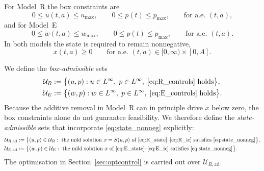 \documentclass[pdflatex,sn-mathphys-num]{sn-jnl}
\theoremstyle{definition}
\theoremstyle{remark}
\begin{document}
For Model~R the box constraints are
\begin{equation}
0\le u(t,a)\le u_{\max}, \qquad 0\le p(t)\le p_{\max},
\qquad \text{for a.e. } (t,a), \label{eq:R_controls}
\end{equation}
and for Model~E
\begin{equation}
0\le w(t,a)\le w_{\max}, \qquad 0\le p(t)\le p_{\max},
\qquad \text{for a.e. } (t,a). \label{eq:E_controls}
\end{equation}
In both models the state is required to remain nonnegative,
\begin{equation}
x(t,a)\ge 0 \qquad \text{for a.e. } (t,a)\in[0,\infty)\times[0,A].
\label{eq:state_nonneg}
\end{equation}

We define the \emph{box-admissible} sets
\begin{align}
\mathcal{U}_R
&:=\bigl\{(u,p): u\in L^\infty,\;p\in L^\infty,\;
\eqref{eq:R_controls}\text{ holds}\bigr\}, \label{eq:UR}\\
\mathcal{U}_E
&:=\bigl\{(w,p): w\in L^\infty,\;p\in L^\infty,\;
\eqref{eq:E_controls}\text{ holds}\bigr\}. \label{eq:UE}
\end{align}
Because the additive removal in Model~R can in principle drive $x$ below zero,
the box constraints alone do not guarantee feasibility. We therefore define
the \emph{state-admissible} sets that incorporate \eqref{eq:state_nonneg}
explicitly:
\begin{align}
\mathcal{U}_{R,\mathrm{ad}}
&:=\bigl\{(u,p)\in\mathcal{U}_R:\ \text{the mild solution } x=S(u,p)
\text{ of \eqref{eq:R_state}--\eqref{eq:R_ic} satisfies }
\eqref{eq:state_nonneg}\bigr\}, \label{eq:URad}\\
\mathcal{U}_{E,\mathrm{ad}}
&:=\bigl\{(w,p)\in\mathcal{U}_E:\ \text{the mild solution } x
\text{ of \eqref{eq:E_state}--\eqref{eq:E_ic} satisfies }
\eqref{eq:state_nonneg}\bigr\}. \label{eq:UEad}
\end{align}
The optimisation in Section~\ref{sec:optcontrol} is carried out over
$\mathcal{U}_{R,\mathrm{ad}}$.
\end{document}
